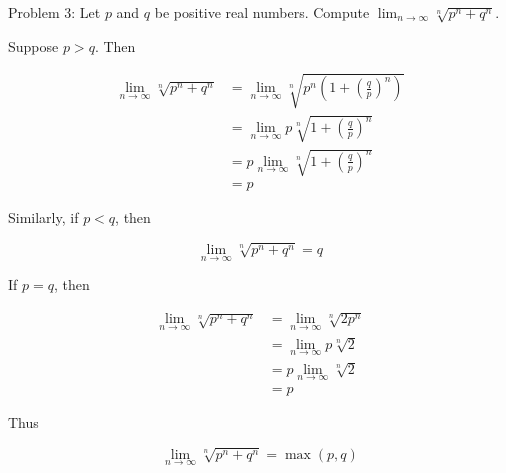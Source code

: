 Problem 3: Let $p$ and $q$ be positive real numbers. Compute $\displaystyle \lim_{n \rightarrow \infty} \sqrt[n]{p^n + q^n}$.

Suppose $p > q$. Then

\begin{align*}
\lim_{n \rightarrow \infty} \sqrt[n]{p^n + q^n} &= \lim_{n \rightarrow \infty} \sqrt[n]{p^n\left(1 + \left(\frac{q}{p}\right)^n\right)} \\
&= \lim_{n \rightarrow \infty} p\sqrt[n]{1 + \left(\frac{q}{p}\right)^n} \\
&= p \lim_{n \rightarrow \infty} \sqrt[n]{1 + \left(\frac{q}{p}\right)^n} \\
&= p
\end{align*}

Similarly, if $p < q$, then

$$\lim_{n \rightarrow \infty} \sqrt[n]{p^n + q^n} = q$$

If $p = q$, then

\begin{align*}
\lim_{n \rightarrow \infty} \sqrt[n]{p^n + q^n} &= \lim_{n \rightarrow \infty} \sqrt[n]{2p^n} \\
&=  \lim_{n \rightarrow \infty} p \sqrt[n]{2} \\
&=  p \lim_{n \rightarrow \infty} \sqrt[n]{2} \\
&= p
\end{align*}

Thus 

$$ \boxed{\lim_{n \rightarrow \infty} \sqrt[n]{p^n + q^n} = \max(p, q)} $$
